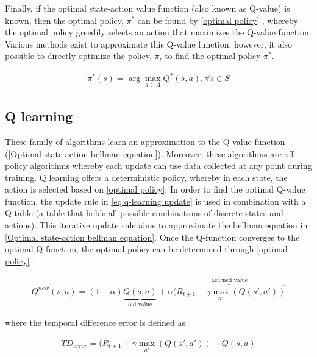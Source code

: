 Finally, if the optimal state-action value function  (also known as Q-value) is known, then the optimal policy, $\pi^*$ can be found by \autoref{optimal policy} \cite{raoOPTIMALPOLICYOPTIMAL}, whereby the optimal policy greedily selects an action that maximizes the Q-value function.
Various methods exist to approximate this Q-value function; however, it also possible to directly optimize the policy, $\pi$, to find the optimal policy $\pi^*$.

\begin{equation}
	\begin{aligned}
		\pi^*(s) = \arg \max_{a \in A} Q^*(s, a), \forall s \in S
	\end{aligned}
	\label{optimal policy}
\end{equation}

\subsection{Q learning}
These family of algorithms learn an approximation to the Q-value function (\autoref{Optimal state-action bellman equation}). Moreover, these algorithms are off-policy algorithms whereby each update can use data collected at any point during training. Q learning offers a deterministic policy, whereby in each state, the action is selected based on \autoref{optimal policy}. In order to find the optimal Q-value function, the update rule in \autoref{eq:q-learning update} is used in combination with a Q-table (a table that holds all possible combinations of discrete states and actions). This iterative update rule aims to approximate the bellman equation in \autoref{Optimal state-action bellman equation}. Once the Q-function converges to the optimal Q-function, the optimal policy can be determined through \autoref{optimal policy} \cite{daveUnderstandingBellmanOptimality2021}.

\begin{equation}
	\begin{aligned}
		Q^{new}(s,a) = (1 -\alpha) \underbrace{Q(s,a)}_{\text{old value}} + \alpha \overbrace{(R_{t+1} + \gamma \max_{a'}(Q(s',a'))}^{\text{Learned value}}
	\end{aligned}
	\label{eq:q-learning update}
\end{equation}

where the temporal difference error is defined as

\begin{equation}
	\begin{aligned}
		TD_{error} = (R_{t+1} + \gamma \max_{a'}(Q(s',a')) - Q(s,a)
	\end{aligned}
	\label{eq:temporal difference}
\end{equation}

